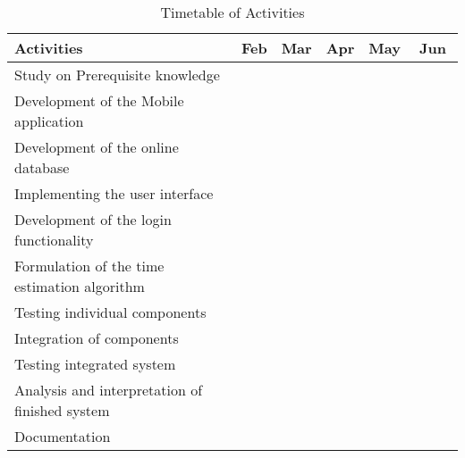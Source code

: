%
%
\newcommand{\weekone}{\textbullet}
\newcommand{\weektwo}{\textbullet \textbullet}
\newcommand{\weekthree}{\textbullet \textbullet \textbullet}
\newcommand{\weekfour}{\textbullet \textbullet \textbullet \textbullet}

\begin{table}[ht] 
\centering
\caption{Timetable of Activities} \vspace{0.25em}
\begin{tabular}{|p{2in}|c|c|c|c|c|} \hline
\centering Activities & Feb & Mar & Apr & May & Jun \\ \hline
Study on Prerequisite knowledge 
& \weektwo~~~ & & & & \\ \hline
Development of the Mobile application 
& ~~~\weektwo & \weekfour & \weekfour & \weekfour & \\ \hline
Development of the online database 
& ~~~\weektwo & \weekthree~~ & & & \\ \hline
Implementing the user interface 
& ~~~\weektwo & \weekfour & \weekfour & \weekthree~~ & \\ \hline
Development of the login functionality 
& & \weekfour & \weekthree~~ & & \\ \hline
Formulation of the time estimation algorithm 
& & ~~~\weektwo & \weekfour & \weektwo~~~ & \\ \hline
Testing individual components 
& & ~~~\weektwo & \weekfour & \weekfour & \\ \hline
Integration of components 
& & & \weekfour & \weekfour & \weekone~~~~~ \\ \hline
Testing integrated system 
& & & \weekfour & \weekfour & \weektwo~~~ \\ \hline
Analysis and interpretation of finished system 
& & & \weekfour & \weekfour & \weekthree~~ \\ \hline
Documentation 
& ~~\weekthree & \weekfour & \weekfour & \weekfour & \weekfour
\\ \hline
\end{tabular}
\label{tab:timetableactivities}
\end{table}
